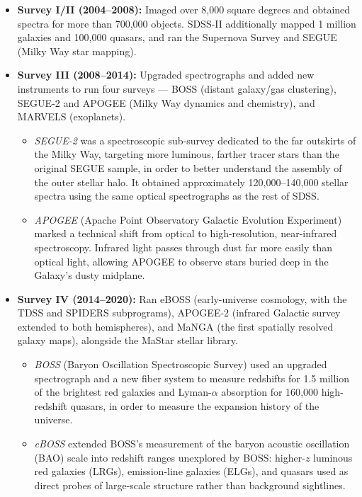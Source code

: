 \documentclass[12pt]{article}
\begin{document}
\begin{itemize}[leftmargin=*]
  \item \textbf{Survey I/II (2004--2008):} Imaged over 8{,}000 square degrees and obtained spectra for more than 700{,}000 objects. SDSS-II additionally mapped 1 million galaxies and 100{,}000 quasars, and ran the Supernova Survey and SEGUE (Milky Way star mapping).
  \item \textbf{Survey III (2008--2014):} Upgraded spectrographs and added new instruments to run four surveys --- BOSS (distant galaxy/gas clustering), SEGUE-2 and APOGEE (Milky Way dynamics and chemistry), and MARVELS (exoplanets).
  \begin{itemize}
    \item \textit{SEGUE-2} was a spectroscopic sub-survey dedicated to the far outskirts of the Milky Way, targeting more luminous, farther tracer stars than the original SEGUE sample, in order to better understand the assembly of the outer stellar halo. It obtained approximately 120{,}000--140{,}000 stellar spectra using the same optical spectrographs as the rest of SDSS.
    \item \textit{APOGEE} (Apache Point Observatory Galactic Evolution Experiment) marked a technical shift from optical to high-resolution, near-infrared spectroscopy. Infrared light passes through dust far more easily than optical light, allowing APOGEE to observe stars buried deep in the Galaxy's dusty midplane.
  \end{itemize}
  \item \textbf{Survey IV (2014--2020):} Ran eBOSS (early-universe cosmology, with the TDSS and SPIDERS subprograms), APOGEE-2 (infrared Galactic survey extended to both hemispheres), and MaNGA (the first spatially resolved galaxy maps), alongside the MaStar stellar library.
  \begin{itemize}
    \item \textit{BOSS} (Baryon Oscillation Spectroscopic Survey) used an upgraded spectrograph and a new fiber system to measure redshifts for 1.5 million of the brightest red galaxies and Lyman-$\alpha$ absorption for 160{,}000 high-redshift quasars, in order to measure the expansion history of the universe.
    \item \textit{eBOSS} extended BOSS's measurement of the baryon acoustic oscillation (BAO) scale into redshift ranges unexplored by BOSS: higher-$z$ luminous red galaxies (LRGs), emission-line galaxies (ELGs), and quasars used as direct probes of large-scale structure rather than background sightlines.
  \end{itemize}
\end{itemize}
\end{document}
